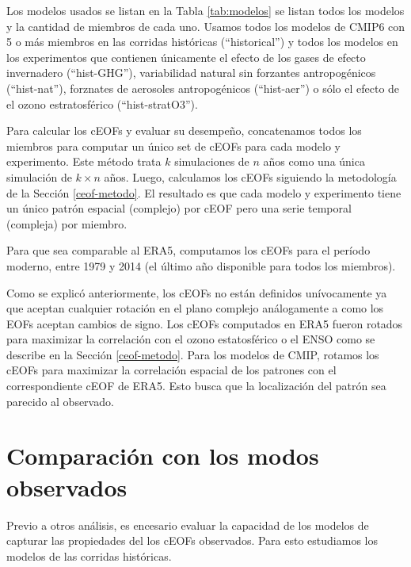 \documentclass[12pt,oneside,a4paper]{reedthesis}
\begin{document}
Los modelos usados se listan en la Tabla \ref{tab:modelos} se listan todos los modelos y la cantidad de miembros de cada uno.
Usamos todos los modelos de CMIP6 con 5 o más miembros en las corridas históricas (``historical'') y todos los modelos en los experimentos que contienen únicamente el efecto de los gases de efecto invernadero (``hist-GHG''), variabilidad natural sin forzantes antropogénicos (``hist-nat''), forznates de aerosoles antropogénicos (``hist-aer'') o sólo el efecto de el ozono estratosférico (``hist-stratO3'').

Para calcular los cEOFs y evaluar su desempeño, concatenamos todos los miembros para computar un único set de cEOFs para cada modelo y experimento.
Este método trata \(k\) simulaciones de \(n\) años como una única simulación de \(k\times n\) años.
Luego, calculamos los cEOFs siguiendo la metodología de la Sección \ref{ceof-metodo}.
El resultado es que cada modelo y experimento tiene un único patrón espacial (complejo) por cEOF pero una serie temporal (compleja) por miembro.

Para que sea comparable al ERA5, computamos los cEOFs para el período moderno, entre 1979 y 2014 (el último año disponible para todos los miembros).

Como se explicó anteriormente, los cEOFs no están definidos unívocamente ya que aceptan cualquier rotación en el plano complejo análogamente a como los EOFs aceptan cambios de signo.
Los cEOFs computados en ERA5 fueron rotados para maximizar la correlación con el ozono estatosférico o el ENSO como se describe en la Sección \ref{ceof-metodo}.
Para los modelos de CMIP, rotamos los cEOFs para maximizar la correlación espacial de los patrones con el correspondiente cEOF de ERA5.
Esto busca que la localización del patrón sea parecido al observado.

\hypertarget{comparaciuxf3n-con-los-modos-observados}{%
\section{Comparación con los modos observados}\label{comparaciuxf3n-con-los-modos-observados}}

Previo a otros análisis, es encesario evaluar la capacidad de los modelos de capturar las propiedades del los cEOFs observados.
Para esto estudiamos los modelos de las corridas históricas.
\end{document}
